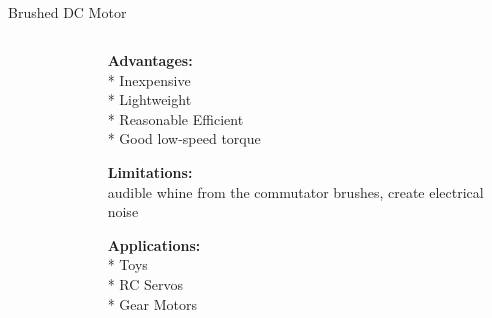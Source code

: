 \subsection{}
{
\begin{frame}{Brushed DC Motor}

\begin{columns}
\begin{column}{0.6\textwidth}  %

	\vspace{-3mm}
   	\begin{figure}
 	\end{figure}

\end{column}

\begin{column}{0.4\textwidth}

{\bf Advantages:} \\
* Inexpensive \\
* Lightweight \\
* Reasonable Efficient \\
* Good low-speed torque

{\bf Limitations:} \\
audible whine from the commutator brushes,
create electrical noise

{\bf Applications:} \\
* Toys \\
* RC Servos \\
* Gear Motors

\end{column}

\end{columns}

\end{frame}
}




